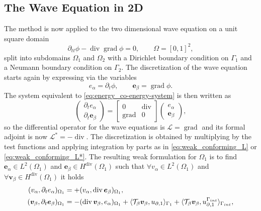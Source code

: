 \documentclass[11pt,a4paper]{article}
\DeclareMathOperator*{\grad}{grad}
\renewcommand{\div}{\operatorname{div}}
\newcommand{\innerproduct}[3][\Omega]{(#2, #3)_{#1}}
\newcommand{\boundary}[3][\partial\Omega]{\langle #2, #3\rangle_{#1}}
\begin{document}
\subsection{The Wave Equation in 2D}\label{sec:Wave}
The method is now applied to the two dimensional wave equation on a unit square domain
\begin{equation}\label{eq:wave_primal}
\partial_{tt}\phi-\div\grad\phi=0, \qquad \Omega = [0, 1]^ 2,    
\end{equation}
split into subdomains $\Omega_1$ and $\Omega_2$ with a Dirichlet boundary condition on $\Gamma_1$ and a Neumann boundary condition on $\Gamma_2$. The discretization of the wave equation starts again by expressing via the variables
\begin{equation}
    {e}_{\alpha} = \partial_t\phi, \qquad \bm{e}_{\beta} = \grad \phi.
\end{equation}
The system equivalent to \eqref{eq:energy_co-energy-system} is then written as
\begin{equation}
    \begin{pmatrix}
        \partial_t {e}_{\alpha} \\
        \partial_t \bm{e}_{\beta}
    \end{pmatrix} = 
    \begin{bmatrix}
        0 & \div \\
        \grad & 0
    \end{bmatrix}
    \begin{pmatrix}
        {e}_{\alpha} \\
        \bm{e}_{\beta}
    \end{pmatrix},
\end{equation}
so the differential operator for the wave equations is $\mathcal{L}=\grad$ and its formal adjoint is now $\mathcal{L}^*=-\div$. The discretization is obtained by multiplying by the test functions and applying integration by parts as in \eqref{eq:weak_conforming_L} or \eqref{eq:weak_conforming_L*}. The resulting weak formulation for $\Omega_1$ is to find $\bm{e}_\alpha\in L^2(\Omega_1)$ and $\bm{e}_\beta\in H^{\div}(\Omega_1)$ such that $\forall{v}_\alpha\in L^2(\Omega_1)$ and $\forall\bm{v}_\beta\in H^{\div}(\Omega_1)$ it holds
\begin{equation}
    \begin{split}
    \begin{alignedat}{2}
        \innerproduct[\Omega_1]{{v}_\alpha}{\partial_t{e}_\alpha} &= + \innerproduct[\Omega_1]{{v}_\alpha}{\div\bm{e}_\beta}, \\
        \innerproduct[\Omega_1]{\bm{v}_\beta}{\partial_t\bm{e}_\beta} &= - \innerproduct[\Omega_1]{\div\bm{v}_\beta}{{e}_\alpha} + \boundary[\Gamma_1]{\mathcal{T}_{\beta}\bm{v}_\beta}{{u}_{\partial,1 }} + \boundary[\Gamma_{\rm int}]{\mathcal{T}_{\beta}\bm{v}_\beta}{u_{\partial, 1}^{\Gamma_{\rm int}}},
    \end{alignedat}
    \end{split}
\label{eq:Wave-weak-D}
\end{equation}
\end{document}
